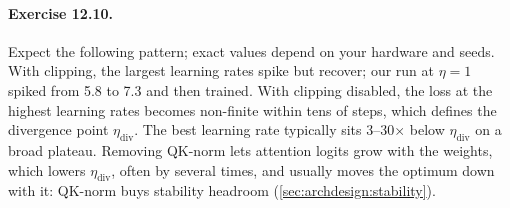 \paragraph{Exercise 12.10.} Expect the following pattern; exact values depend on your hardware
and seeds. With clipping, the largest learning rates spike but recover; our run at $\eta=1$
spiked from 5.8 to 7.3 and then trained. With clipping disabled, the loss at the highest
learning rates becomes non-finite within tens of steps, which defines the divergence point
$\eta_{\text{div}}$. The best learning rate typically sits 3--30$\times$ below $\eta_{\text{div}}$
on a broad plateau. Removing QK-norm lets attention logits grow with the weights, which lowers
$\eta_{\text{div}}$, often by several times, and usually moves the optimum down with it: QK-norm
buys stability headroom (\cref{sec:archdesign:stability}).
